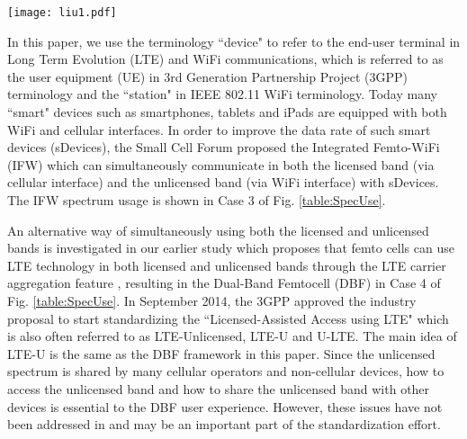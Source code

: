 \documentclass[journal,final,letterpaper,10pt,doublecolumn,twoside]{IEEEtran}
\begin{document}
\begin{figure*}
  \center
  \texttt{[image: liu1.pdf]}
  \caption{Spectrum and radio access technologies used by each type of small cell. Long Term Evolution (LTE) and WiFi represent the air
interfaces used in a band; blank box means the spectrum is  not used.} \label{table:SpecUse}
\end{figure*}




In this paper, we use the terminology ``device" to refer to the end-user terminal in Long Term Evolution (LTE) and WiFi communications, which is referred to as the user equipment (UE) in 3rd Generation Partnership Project (3GPP) terminology and the ``station" in IEEE 802.11 WiFi terminology.
Today many ``smart" devices such as  smartphones, tablets and iPads are equipped with both WiFi and cellular interfaces. In
order to improve the data rate of such smart devices (sDevices), the Small Cell
Forum proposed the Integrated Femto-WiFi (IFW)
\cite{femto-forum-IFW} which can simultaneously communicate in
both the licensed band (via cellular interface) and the unlicensed
band (via WiFi interface) with sDevices. The IFW spectrum usage is shown in Case 3 of Fig.
\ref{table:SpecUse}.

An alternative way of simultaneously using both the licensed and unlicensed bands is investigated in our earlier study \cite{feilu_femto_accessScheme} which proposes that femto cells can use LTE technology in both licensed and unlicensed bands through the LTE carrier aggregation feature \cite{LTE-A}, resulting in the Dual-Band Femtocell (DBF) in Case 4 of Fig. \ref{table:SpecUse}.  In September 2014, the 3GPP approved the industry proposal \cite{3GPP2014LTE-U} to start standardizing the ``Licensed-Assisted Access using LTE" which is also often referred to as LTE-Unlicensed, LTE-U and U-LTE. The main idea of LTE-U is the same as the DBF framework in this paper.  Since the unlicensed spectrum is shared by many cellular operators and non-cellular devices, how to access the unlicensed band and how to share the unlicensed band with other devices is essential to the DBF user experience. However, these issues have not been addressed in \cite{3GPP2014LTE-U} and may be an important part of the standardization effort.
\end{document}
